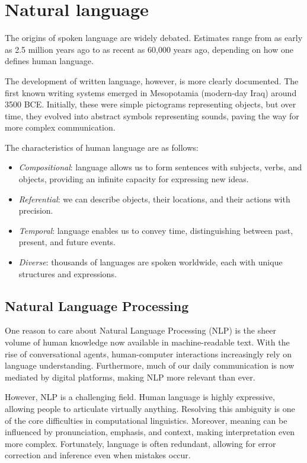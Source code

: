 \section{Natural language}

The origins of spoken language are widely debated. 
Estimates range from as early as 2.5 million years ago to as recent as 60,000 years ago, depending on how one defines human language.

The development of written language, however, is more clearly documented. 
The first known writing systems emerged in Mesopotamia (modern-day Iraq) around 3500 BCE. 
Initially, these were simple pictograms representing objects, but over time, they evolved into abstract symbols representing sounds, paving the way for more complex communication.

The characteristics of human language are as follows: 
\begin{itemize}
    \item \textit{Compositional}: language allows us to form sentences with subjects, verbs, and objects, providing an infinite capacity for expressing new ideas.
    \item \textit{Referential}: we can describe objects, their locations, and their actions with precision.
    \item \textit{Temporal}: language enables us to convey time, distinguishing between past, present, and future events.
    \item \textit{Diverse}: thousands of languages are spoken worldwide, each with unique structures and expressions.
\end{itemize}

\subsection{Natural Language Processing}
One reason to care about Natural Language Processing (NLP) is the sheer volume of human knowledge now available in machine-readable text. 
With the rise of conversational agents, human-computer interactions increasingly rely on language understanding. 
Furthermore, much of our daily communication is now mediated by digital platforms, making NLP more relevant than ever.

However, NLP is a challenging field. 
Human language is highly expressive, allowing people to articulate virtually anything. 
Resolving this ambiguity is one of the core difficulties in computational linguistics. 
Moreover, meaning can be influenced by pronunciation, emphasis, and context, making interpretation even more complex. 
Fortunately, language is often redundant, allowing for error correction and inference even when mistakes occur.


